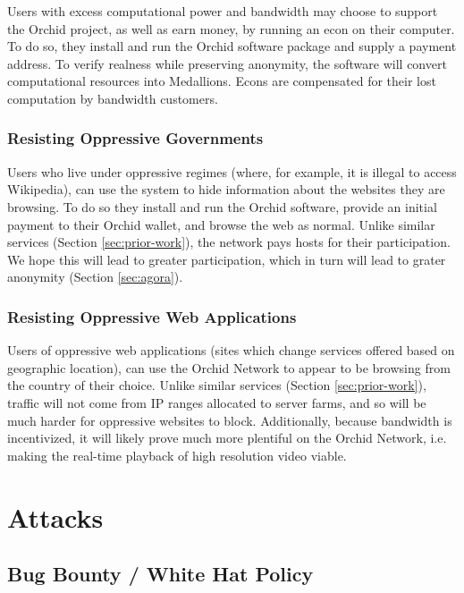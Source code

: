 \documentclass{article}
\newcommand{\orchid}{Orchid}
\newcommand{\Orchid}{\orchid}
\begin{document}
Users with excess computational power and bandwidth may choose to support the \Orchid{} project, as well as earn money, by running an econ on their computer. To do so, they install and run the \Orchid{} software package and supply a payment address. To verify realness while preserving anonymity, the software will convert computational resources into Medallions. Econs are compensated for their lost computation by bandwidth customers.

\subsubsection{Resisting Oppressive Governments}

Users who live under oppressive regimes (where, for example, it is illegal to access Wikipedia), can use the system to hide information about the websites they are browsing. To do so they install and run the \Orchid{} software, provide an initial payment to their \Orchid{} wallet, and browse the web as normal. Unlike similar services (Section \ref{sec:prior-work}), the network pays hosts for their participation. We hope this will lead to greater participation, which in turn will lead to grater anonymity (Section \ref{sec:agora}).

\subsubsection{Resisting Oppressive Web Applications}

Users of oppressive web applications (sites which change services offered based on geographic location), can use the \Orchid{} Network to appear to be browsing from the country of their choice. Unlike similar services (Section \ref{sec:prior-work}), traffic will not come from IP ranges allocated to server farms, and so will be much harder for oppressive websites to block. Additionally, because bandwidth is incentivized, it will likely prove much more plentiful on the \Orchid{} Network, i.e. making the real-time playback of high resolution video viable.


\section{Attacks}
\label{sec:attacks}

\subsection{Bug Bounty / White Hat Policy}
\end{document}
